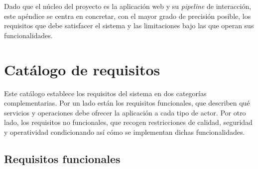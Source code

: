 Dado que el núcleo del proyecto es la aplicación web y su \textit{pipeline} de interacción, este apéndice se centra en concretar, con el mayor grado de precisión posible, los requisitos que debe satisfacer el sistema y las limitaciones bajo las que operan sus funcionalidades.

\section{Catálogo de requisitos}

Este catálogo establece los requisitos del sistema en dos categorías complementarias. Por un lado están los requisitos funcionales, que describen qué servicios y operaciones debe ofrecer la aplicación a cada tipo de actor. Por otro lado, los requisitos no funcionales, que recogen restricciones de calidad, seguridad y operatividad condicionando así cómo se implementan dichas funcionalidades.

\subsection{Requisitos funcionales}

